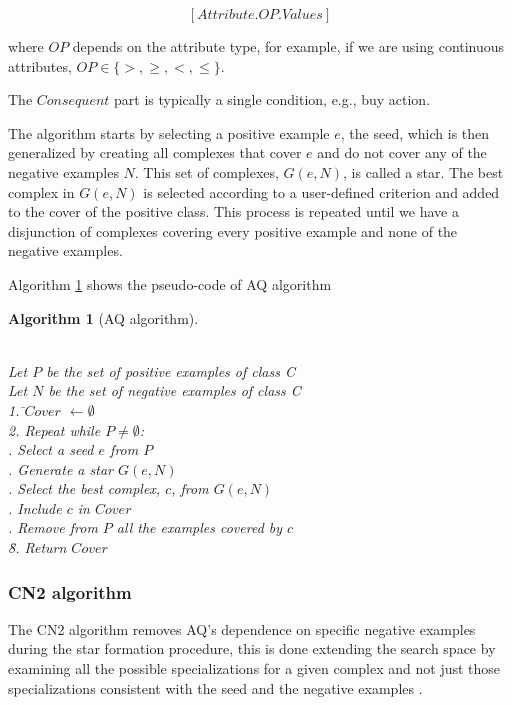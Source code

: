 \documentclass[preprint,3p,twocolumn]{elsarticle}
\newtheorem{algorithm}{Algorithm}[section]
\begin{document}
$$ \left[Attribute.OP.Values\right]$$

where $OP$ depends on the attribute type, for example, if we are using continuous attributes, $OP \in \{ >, \geq, <, \leq  \}$.

The $Consequent$ part is typically a single condition, e.g., buy action.

The algorithm starts by selecting a positive example $e$, the seed, which is then generalized by creating all complexes that cover $e$ and do not cover any of the negative examples $N$. This set of complexes, $G(e,N)$, is called a star. The best complex in $G(e,N)$ is selected according to a user-defined criterion and added to the cover of the positive class. This process is repeated until we have a disjunction of complexes covering every positive example and none of the negative examples.

Algorithm \ref{algo:AQ} shows the pseudo-code of AQ algorithm
\begin{algorithm}[AQ algorithm]
\begin{tabbing}
\\Let $P$ be the set of positive examples of class C
\\Let $N$ be the set of negative examples of class C\\
1. \=$Cover$ $\leftarrow \emptyset $ \\
2. Repeat while $P \neq \emptyset$:\\
 . Select a seed $e$ from $P$\\
 . Generate a star $G(e,N)$\\
 . Select the best complex, $c$, from $G(e,N)$\\
 . Include $c$ in $Cover$\\
 . Remove from $P$ all the examples covered by $c$\\
\=8. Return $Cover$
\end{tabbing}
\label{algo:AQ}
\end{algorithm}

\subsubsection{CN2 algorithm}
The CN2 algorithm removes AQ's dependence on specific negative examples during the star formation procedure, this is done extending the search space by examining all the possible specializations for a given complex and not just those specializations consistent with the seed and the negative examples \cite{CN2-Clark1989}.
\end{document}
